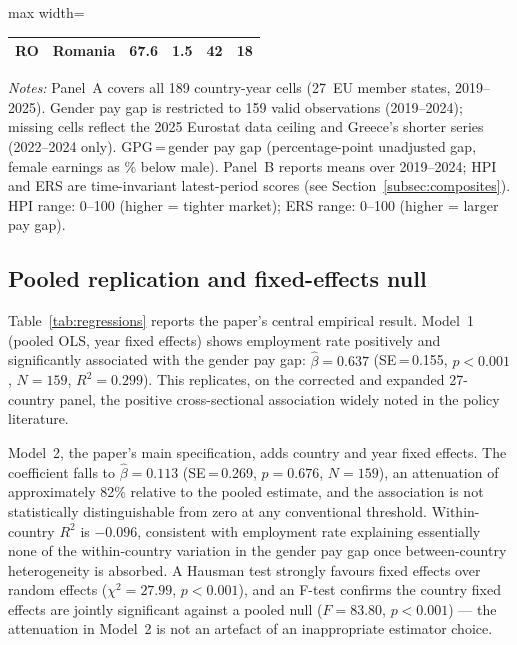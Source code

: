 \documentclass[12pt,a4paper]{article}
\begin{document}
\begin{table}[htbp]
\begin{threeparttable}
\begin{adjustbox}{max width=\textwidth}
\begin{tabular}{llrrrr}
RO & Romania      & 67.6 &  1.5 &  42 & 18 \\
\bottomrule
\end{tabular}
\end{adjustbox}
\begin{tablenotes}
\footnotesize
\item \textit{Notes:} Panel~A covers all 189 country-year cells (27~EU member
  states, 2019--2025).  Gender pay gap is restricted to 159 valid observations
  (2019--2024); missing cells reflect the 2025 Eurostat data ceiling and
  Greece's shorter series (2022--2024 only).  GPG\,=\,gender pay gap
  (percentage-point unadjusted gap, female earnings as \% below male).
  Panel~B reports means over 2019--2024; HPI and ERS are time-invariant
  latest-period scores (see Section~\ref{subsec:composites}).
  HPI range: 0--100 (higher = tighter market);
  ERS range: 0--100 (higher = larger pay gap).
\end{tablenotes}
\end{threeparttable}
\end{table}

\subsection{Pooled replication and fixed-effects null}
\label{subsec:pooled_fe}

Table~\ref{tab:regressions} reports the paper's central empirical result.
Model~1 (pooled OLS, year fixed effects) shows employment rate positively and
significantly associated with the gender pay gap: $\hat{\beta}=0.637$
(SE\,=\,0.155, $p<0.001$, $N=159$, $R^{2}=0.299$).  This replicates, on the
corrected and expanded 27-country panel, the positive cross-sectional association
widely noted in the policy literature.

Model~2, the paper's main specification, adds country and year fixed effects.
The coefficient falls to $\hat{\beta}=0.113$ (SE\,=\,0.269, $p=0.676$, $N=159$),
an attenuation of approximately 82\% relative to the pooled estimate, and the
association is not statistically distinguishable from zero at any conventional
threshold.  Within-country $R^{2}$ is $-0.096$, consistent with employment rate
explaining essentially none of the within-country variation in the gender pay gap
once between-country heterogeneity is absorbed.  A Hausman test strongly favours
fixed effects over random effects ($\chi^{2}=27.99$, $p<0.001$), and an F-test
confirms the country fixed effects are jointly significant against a pooled null
($F=83.80$, $p<0.001$) --- the attenuation in Model~2 is not an artefact of an
inappropriate estimator choice.
\end{document}
